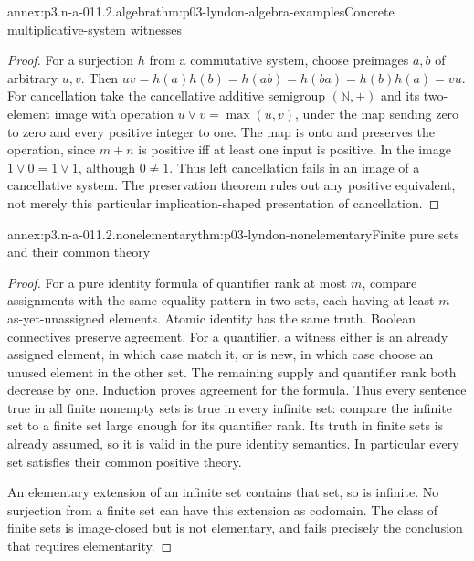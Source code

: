 \begin{annexitem}{annex:p3.n-a-011.2.algebra}{thm:p03-lyndon-algebra-examples}{Concrete multiplicative-system witnesses}
\begin{proof}
For a surjection \(h\) from a commutative system, choose preimages
\(a,b\) of arbitrary \(u,v\). Then
\(uv=h(a)h(b)=h(ab)=h(ba)=h(b)h(a)=vu\).
For cancellation take the cancellative additive semigroup
\((\mathbb N,+)\) and its two-element image with operation
\(u\mathbin{\vee}v=\max(u,v)\), under the map sending zero to zero
and every positive integer to one. The map is onto and preserves the
operation, since \(m+n\) is positive iff at least one input is positive.
In the image \(1\vee0=1\vee1\), although \(0\ne1\). Thus left
cancellation fails in an image of a cancellative system. The preservation
theorem rules out any positive equivalent, not merely this particular
implication-shaped presentation of cancellation.
\end{proof}
\end{annexitem}

\begin{annexitem}{annex:p3.n-a-011.2.nonelementary}{thm:p03-lyndon-nonelementary}{Finite pure sets and their common theory}
\begin{proof}
For a pure identity formula of quantifier rank at most \(m\), compare
assignments with the same equality pattern in two sets, each having at
least \(m\) as-yet-unassigned elements. Atomic identity has the same
truth. Boolean connectives preserve agreement. For a quantifier, a
witness either is an already assigned element, in which case match it,
or is new, in which case choose an unused element in the other set.
The remaining supply and quantifier rank both decrease by one. Induction
proves agreement for the formula. Thus every sentence true in all finite
nonempty sets is true in every infinite set: compare the infinite set to
a finite set large enough for its quantifier rank. Its truth in finite
sets is already assumed, so it is valid in the pure identity semantics.
In particular every set satisfies their common positive theory.

An elementary extension of an infinite set contains that set, so is
infinite. No surjection from a finite set can have this extension as
codomain. The class of finite sets is image-closed but is not elementary,
and fails precisely the conclusion that requires elementarity.
\end{proof}
\end{annexitem}

